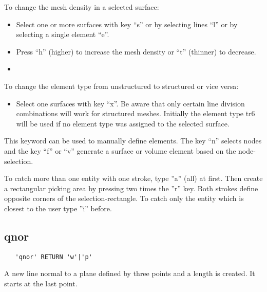 \documentclass{article}
\begin{document}
To change the mesh density in a selected surface:
\begin{itemize}
\item Select one or more surfaces with key ``s'' or by selecting lines ``l'' or by selecting a single element ``e''.
\item Press ``h'' (higher) to increase the mesh density or ``t'' (thinner) to decrease.  
\item 
\end{itemize}
To change the element type from unstructured to structured or vice versa:
\begin{itemize}
\item Select one surfaces with key ``x''. Be aware that only certain line division combinations will work for structured meshes. Initially the element type tr6 will be used if no element type was assigned to the selected surface.
\end{itemize}

This keyword can be used to manually define elements. The key ``n'' selects nodes and the key ``f'' or ``v'' generate a surface or volume element based on the node-selection.

To catch more than one entity with one stroke, type ''a'' (all) at first. Then create a rectangular picking area by pressing two times the ''r'' key. Both strokes define opposite corners of the selection-rectangle. To catch only the entity which is closest to the user type ''i'' before.

\subsection{\label{qnor}qnor}
\begin{verbatim}
   'qnor' RETURN 'w'|'p'
\end{verbatim}
A new line normal to a plane defined by three points and a length is created. It starts at the last point.
\end{document}
